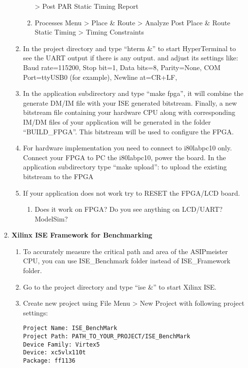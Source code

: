 \begin{enumerate}
\begin{enumerate}
\begin{enumerate}
		\textgreater{} Post PAR Static Timing Report
		\item
		Processes Menu \textgreater{} Place \& Route \textgreater{} Analyze
		Post Place \& Route Static Timing \textgreater{} Timing Constraints
	\end{enumerate}
	\item
	In the project directory and type ``hterm \&'' to start HyperTerminal
	to see the UART output if there is any output. and adjust its settings
	like: Baud rate=115200, Stop bit=1, Data bits=8, Parity=None, COM
	Port=ttyUSB0 (for example), Newline at=CR+LF,
	\item
	In the application subdirectory and type ``make fpga'', it will
	combine the generate DM/IM file with your ISE generated bitstream.
	Finally, a new bitstream file containing your hardware CPU along with
	corresponding IM/DM files of your application will be generated in the
	folder ``BUILD\_FPGA''. This bitstream will be used to configure the
	FPGA.
	\item
	For hardware implementation you need to connect to i80labpc10 only.
	Connect your FPGA to PC the i80labpc10, power the board. In the
	application subdirectory type ``make upload'': to upload the existing
	bitstream to the FPGA
	\item
	\color{blue}If your application does not work try to RESET the FPGA/LCD board.\normalcolor
	\begin{enumerate}[label=(\alph*),start=2]
		\color{red}\item\normalcolor
		Does it work on FPGA? Do you see anything on LCD/UART?
		ModelSim?
	\end{enumerate}
\end{enumerate}
\item \textbf{Xilinx ISE Framework for Benchmarking}
	\begin{enumerate}
		\item
		To accurately measure the critical path and area of the ASIPmeister
		CPU, you can use ISE\_Benchmark folder instead of ISE\_Framework
		folder.
		\item
		Go to the project directory and type ``ise \&'' to start Xilinx ISE.
		\item
		Create new project using File Menu \textgreater{} New Project with
		following project settings:
	\begin{lstlisting}
Project Name: ISE_BenchMark
Project Path: PATH_TO_YOUR_PROJECT/ISE_BenchMark
Device Family: Virtex5
Device: xc5vlx110t
Package: ff1136
	\end{lstlisting}

\end{enumerate}
\end{enumerate}

